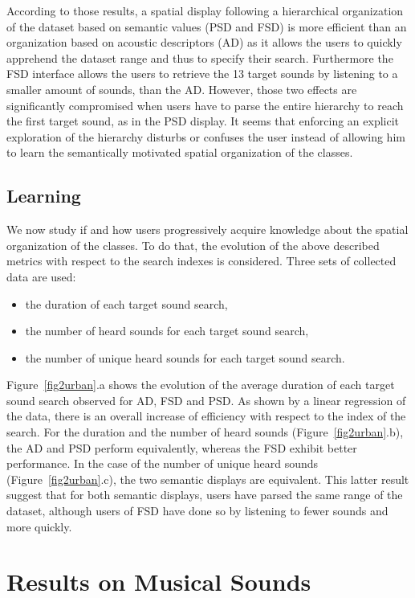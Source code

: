 \documentclass{aes2e}
\begin{document}
According to those results, a spatial display following a hierarchical organization of the dataset based on semantic values (PSD and FSD) is more efficient than an organization based on acoustic descriptors (AD) as it allows the users to quickly apprehend the dataset range and thus to specify their search. Furthermore the FSD interface allows the users to retrieve the 13 target sounds by listening to a smaller amount of sounds, than the AD. However, those two effects are significantly compromised when users have to parse the entire hierarchy to reach the first target sound, as in the PSD display. It seems that enforcing an explicit exploration of the hierarchy disturbs or confuses the user instead of allowing him to learn the semantically motivated spatial organization of the classes. 


\subsection{Learning}

We now study if and how users progressively acquire knowledge about the spatial organization of the classes. To do that, the evolution of the above described metrics with respect to the search indexes is considered. Three sets of collected data are used:

\begin{itemize}
\item the duration of each target sound search,
\item the number of heard sounds for each target sound search,
\item the number of unique heard sounds for each target sound search. 
\end{itemize}

Figure~\ref{fig2urban}.a shows the evolution of the average duration of each target sound search observed for AD, FSD and PSD. As shown by a linear regression of the data, there is an overall increase of efficiency with respect to the index of the search. For the duration and the number of heard sounds (Figure~\ref{fig2urban}.b), the AD and PSD perform equivalently, whereas the FSD exhibit better performance. In the case of the number of unique heard sounds (Figure~\ref{fig2urban}.c), the two semantic displays are equivalent. This latter result suggest that for both semantic displays, users have parsed the same range of the dataset, although users of FSD have done so by listening to fewer sounds and more quickly. 

\section{Results on Musical Sounds} \label{resultsm}
\end{document}
